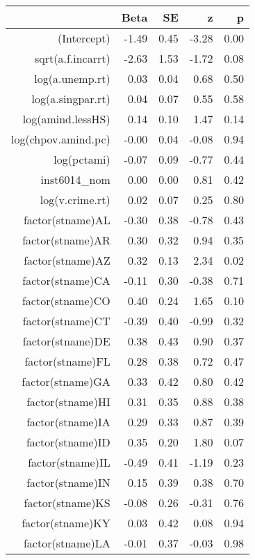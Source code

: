 \begin{table}[ht]
\centering
\begin{tabular}{rrrrr}
  \hline
 & Beta & SE & z & p \\ 
  \hline
(Intercept) & -1.49 & 0.45 & -3.28 & 0.00 \\ 
  sqrt(a.f.incarrt) & -2.63 & 1.53 & -1.72 & 0.08 \\ 
  log(a.unemp.rt) & 0.03 & 0.04 & 0.68 & 0.50 \\ 
  log(a.singpar.rt) & 0.04 & 0.07 & 0.55 & 0.58 \\ 
  log(amind.lessHS) & 0.14 & 0.10 & 1.47 & 0.14 \\ 
  log(chpov.amind.pc) & -0.00 & 0.04 & -0.08 & 0.94 \\ 
  log(pctami) & -0.07 & 0.09 & -0.77 & 0.44 \\ 
  inst6014\_nom & 0.00 & 0.00 & 0.81 & 0.42 \\ 
  log(v.crime.rt) & 0.02 & 0.07 & 0.25 & 0.80 \\ 
  factor(stname)AL & -0.30 & 0.38 & -0.78 & 0.43 \\ 
  factor(stname)AR & 0.30 & 0.32 & 0.94 & 0.35 \\ 
  factor(stname)AZ & 0.32 & 0.13 & 2.34 & 0.02 \\ 
  factor(stname)CA & -0.11 & 0.30 & -0.38 & 0.71 \\ 
  factor(stname)CO & 0.40 & 0.24 & 1.65 & 0.10 \\ 
  factor(stname)CT & -0.39 & 0.40 & -0.99 & 0.32 \\ 
  factor(stname)DE & 0.38 & 0.43 & 0.90 & 0.37 \\ 
  factor(stname)FL & 0.28 & 0.38 & 0.72 & 0.47 \\ 
  factor(stname)GA & 0.33 & 0.42 & 0.80 & 0.42 \\ 
  factor(stname)HI & 0.31 & 0.35 & 0.88 & 0.38 \\ 
  factor(stname)IA & 0.29 & 0.33 & 0.87 & 0.39 \\ 
  factor(stname)ID & 0.35 & 0.20 & 1.80 & 0.07 \\ 
  factor(stname)IL & -0.49 & 0.41 & -1.19 & 0.23 \\ 
  factor(stname)IN & 0.15 & 0.39 & 0.38 & 0.70 \\ 
  factor(stname)KS & -0.08 & 0.26 & -0.31 & 0.76 \\ 
  factor(stname)KY & 0.03 & 0.42 & 0.08 & 0.94 \\ 
  factor(stname)LA & -0.01 & 0.37 & -0.03 & 0.98 \\ 

\end{tabular}
\end{table}

